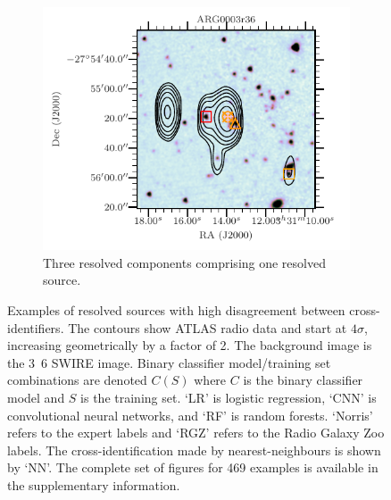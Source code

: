 \begin{figure}
        \begin{subfigure}{0.45\textwidth}
            \includegraphics[width=\textwidth]{atlas-images/examples_all/example_sorted_5_207.pdf}
            \caption{Three resolved components comprising one resolved source.}
        \end{subfigure}
        \caption[Examples of resolved sources with high disagreement between cross-identifiers.]{\label{fig:examples} Examples of resolved sources with high disagreement between cross-identifiers. The contours show ATLAS radio data and start at $4\sigma$, increasing geometrically by a factor of 2. The background image is the \unit{3.6}{\micro\meter} SWIRE image. Binary classifier model/training set combinations are denoted $C(S)$ where $C$ is the binary classifier model and $S$ is the training set. `LR' is logistic regression, `CNN' is convolutional neural networks, and `RF' is random forests. `Norris' refers to the expert labels and `RGZ' refers to the Radio Galaxy Zoo labels. The cross-identification made by nearest-neighbours is shown by `NN'. The complete set of figures for 469 examples is available in the supplementary information.}
    \end{figure}

%
\unappendix